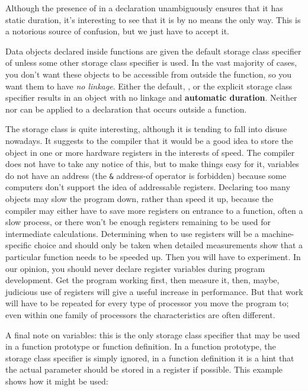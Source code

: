     Although the presence of \static{} in a declaration
     unambiguously ensures that it has static duration, it's interesting to
     see that it is by no means the only way. This is a notorious source of
     confusion, but we just have to accept it.


    Data objects declared inside functions are given the default storage
     class specifier of \auto{} unless some other storage class
     specifier is used. In the vast majority of cases, you don't want these
     objects to be accessible from outside the function, so you want them to
     have \textit{no linkage}. Either the default, \auto, or the
     explicit \register{} storage class specifier results in an
     object with no linkage and \textbf{automatic duration}. Neither
     \auto{} nor \register{} can be applied to
     a declaration that occurs outside a function.


    The \register{} storage class is quite interesting,
     although it is tending to fall into disuse nowadays. It suggests to the
     compiler that it would be a good idea to store the object in one or
     more hardware registers in the interests of speed. The compiler does
     not have to take any notice of this, but to make things easy for it,
     \register{} variables do not have an address (the
     \texttt{\&} address-of operator is forbidden) because some
     computers don't support the idea of addressable registers. Declaring
     too many \register{} objects may slow the program down,
     rather than speed it up, because the compiler may either have to save
     more registers on entrance to a function, often a slow process, or
     there won't be enough registers remaining to be used for intermediate
     calculations. Determining when to use registers will be
     a machine-specific choice and should only be taken when detailed
     measurements show that a particular function needs to be speeded up.
     Then you will have to experiment. In our opinion, you should never
     declare register variables during program development. Get the program
     working first, then measure it, then, maybe, judicious use of registers
     will give a useful increase in performance. But that work will have to
     be repeated for every type of processor you move the program to; even
     within one family of processors the characteristics are often
     different.


    A final note on \register{} variables: this is the only
     storage class specifier that may be used in a function prototype or
     function definition. In a function prototype, the storage class
     specifier is simply ignored, in a function definition it is a hint that
     the actual parameter should be stored in a register if possible. This
     example shows how it might be used:


